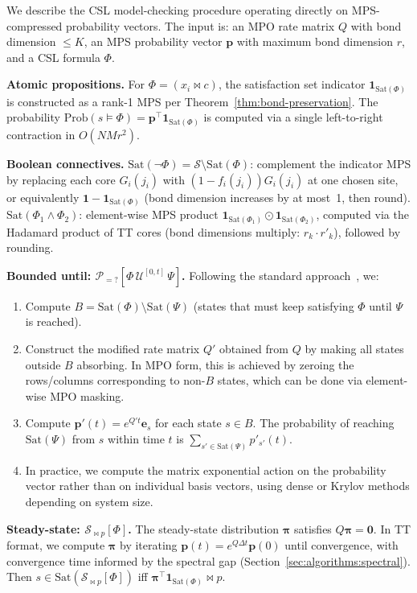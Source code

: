 \documentclass[11pt]{article}
\newcommand{\Sat}{\mathrm{Sat}}
\newcommand{\Prob}{\mathrm{Prob}}
\newcommand{\calS}{\mathcal{S}}
\begin{document}
We describe the CSL model-checking procedure operating directly on
MPS-compressed probability vectors.
The input is: an MPO rate matrix $Q$ with bond dimension $\leq K$,
an MPS probability vector $\mathbf{p}$ with maximum bond dimension $r$,
and a CSL formula $\Phi$.

\medskip
\noindent\textbf{Atomic propositions.}
For $\Phi = (x_i \bowtie c)$, the satisfaction set indicator
$\mathbf{1}_{\Sat(\Phi)}$ is constructed as a rank-1 MPS per
Theorem~\ref{thm:bond-preservation}.
The probability $\Prob(s \models \Phi) = \mathbf{p}^\top \mathbf{1}_{\Sat(\Phi)}$
is computed via a single left-to-right contraction in $O(NMr^2)$.

\medskip
\noindent\textbf{Boolean connectives.}
$\Sat(\neg\Phi) = \calS \setminus \Sat(\Phi)$: complement the indicator
MPS by replacing each core $G_i(j_i)$ with
$(1 - f_i(j_i))G_i(j_i)$ at one chosen site, or equivalently
$\mathbf{1} - \mathbf{1}_{\Sat(\Phi)}$ (bond dimension increases by
at most~1, then round).
$\Sat(\Phi_1 \wedge \Phi_2)$: element-wise MPS product
$\mathbf{1}_{\Sat(\Phi_1)} \odot \mathbf{1}_{\Sat(\Phi_2)}$,
computed via the Hadamard product of TT cores
(bond dimensions multiply: $r_k \cdot r'_k$), followed by rounding.

\medskip
\noindent\textbf{Bounded until: $\mathcal{P}_{=?}[\Phi\,\mathcal{U}^{[0,t]}\,\Psi]$.}
Following the standard approach~\cite{baier2003}, we:
\begin{enumerate}[itemsep=1pt]
\item Compute $B = \Sat(\Phi) \setminus \Sat(\Psi)$ (states that
  must keep satisfying $\Phi$ until $\Psi$ is reached).
\item Construct the modified rate matrix $Q'$ obtained from $Q$ by
  making all states outside $B$ absorbing.
  In MPO form, this is achieved by zeroing the rows/columns
  corresponding to non-$B$ states, which can be done via element-wise
  MPO masking.
\item Compute $\mathbf{p}'(t) = e^{Q't}\mathbf{e}_s$ for each state $s \in B$.
  The probability of reaching $\Sat(\Psi)$ from $s$ within time $t$
  is $\sum_{s' \in \Sat(\Psi)} p'_{s'}(t)$.
\item In practice, we compute the matrix exponential action on the
  probability vector rather than on individual basis vectors,
  using dense or Krylov methods depending on system size.
\end{enumerate}

\medskip
\noindent\textbf{Steady-state: $\mathcal{S}_{\bowtie p}[\Phi]$.}
The steady-state distribution $\boldsymbol{\pi}$ satisfies
$Q\boldsymbol{\pi} = \mathbf{0}$.
In TT format, we compute $\boldsymbol{\pi}$ by iterating
$\mathbf{p}(t) = e^{Q\Delta t}\mathbf{p}(0)$ until convergence,
with convergence time informed by the spectral gap
(Section~\ref{sec:algorithms:spectral}).
Then
$s \in \Sat(\mathcal{S}_{\bowtie p}[\Phi])$ iff
$\boldsymbol{\pi}^\top \mathbf{1}_{\Sat(\Phi)} \bowtie p$.
\end{document}

